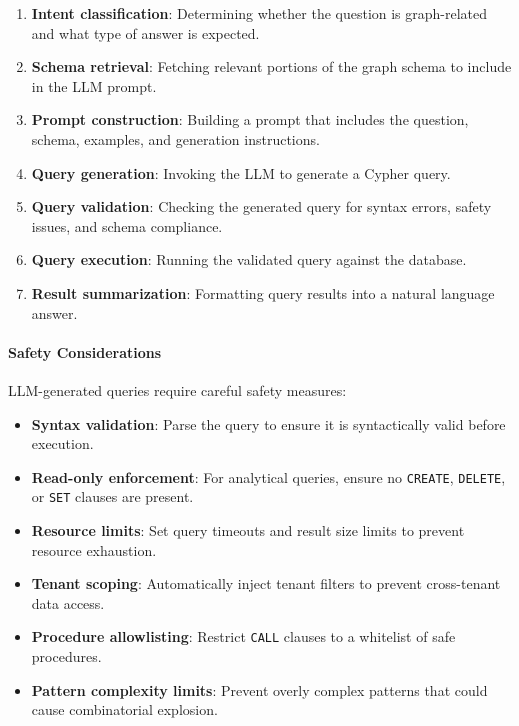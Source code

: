 \begin{enumerate}
    \item \textbf{Intent classification}: Determining whether the question is graph-related and what type of answer is expected.
    
    \item \textbf{Schema retrieval}: Fetching relevant portions of the graph schema to include in the LLM prompt.
    
    \item \textbf{Prompt construction}: Building a prompt that includes the question, schema, examples, and generation instructions.
    
    \item \textbf{Query generation}: Invoking the LLM to generate a Cypher query.
    
    \item \textbf{Query validation}: Checking the generated query for syntax errors, safety issues, and schema compliance.
    
    \item \textbf{Query execution}: Running the validated query against the database.
    
    \item \textbf{Result summarization}: Formatting query results into a natural language answer.
\end{enumerate}

\paragraph{Safety Considerations}

LLM-generated queries require careful safety measures:

\begin{itemize}
    \item \textbf{Syntax validation}: Parse the query to ensure it is syntactically valid before execution.
    
    \item \textbf{Read-only enforcement}: For analytical queries, ensure no \texttt{CREATE}, \texttt{DELETE}, or \texttt{SET} clauses are present.
    
    \item \textbf{Resource limits}: Set query timeouts and result size limits to prevent resource exhaustion.
    
    \item \textbf{Tenant scoping}: Automatically inject tenant filters to prevent cross-tenant data access.
    
    \item \textbf{Procedure allowlisting}: Restrict \texttt{CALL} clauses to a whitelist of safe procedures.
    
    \item \textbf{Pattern complexity limits}: Prevent overly complex patterns that could cause combinatorial explosion.
\end{itemize}

